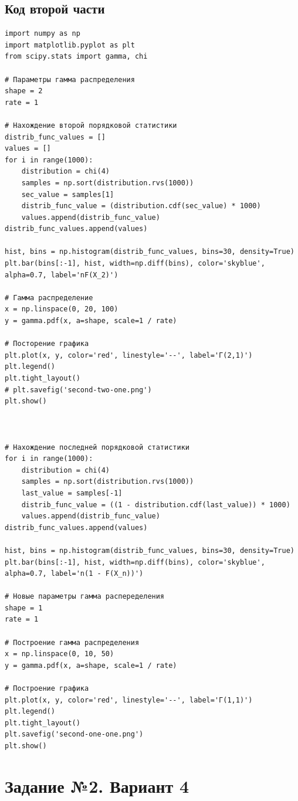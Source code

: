 \documentclass{article}
\begin{document}
\subsection{Код второй части}\label{subsec:--}
\begin{verbatim}
import numpy as np
import matplotlib.pyplot as plt
from scipy.stats import gamma, chi

# Параметры гамма распределения
shape = 2
rate = 1

# Нахождение второй порядковой статистики
distrib_func_values = []
values = []
for i in range(1000):
    distribution = chi(4)
    samples = np.sort(distribution.rvs(1000))
    sec_value = samples[1]
    distrib_func_value = (distribution.cdf(sec_value) * 1000)
    values.append(distrib_func_value)
distrib_func_values.append(values)

hist, bins = np.histogram(distrib_func_values, bins=30, density=True)
plt.bar(bins[:-1], hist, width=np.diff(bins), color='skyblue', alpha=0.7, label='nF(X_2)')

# Гамма распределение
x = np.linspace(0, 20, 100)
y = gamma.pdf(x, a=shape, scale=1 / rate)

# Посторение графика
plt.plot(x, y, color='red', linestyle='--', label='Г(2,1)')
plt.legend()
plt.tight_layout()
# plt.savefig('second-two-one.png')
plt.show()



# Нахождение последней порядковой статистики
for i in range(1000):
    distribution = chi(4)
    samples = np.sort(distribution.rvs(1000))
    last_value = samples[-1]
    distrib_func_value = ((1 - distribution.cdf(last_value)) * 1000)
    values.append(distrib_func_value)
distrib_func_values.append(values)

hist, bins = np.histogram(distrib_func_values, bins=30, density=True)
plt.bar(bins[:-1], hist, width=np.diff(bins), color='skyblue', alpha=0.7, label='n(1 - F(X_n))')

# Новые параметры гамма распеределения
shape = 1
rate = 1

# Построение гамма распределения
x = np.linspace(0, 10, 50)
y = gamma.pdf(x, a=shape, scale=1 / rate)

# Построение графика
plt.plot(x, y, color='red', linestyle='--', label='Г(1,1)')
plt.legend()
plt.tight_layout()
plt.savefig('second-one-one.png')
plt.show()
\end{verbatim}

\section{Задание №2. Вариант 4}\label{sec:-no2.--4}
\end{document}
